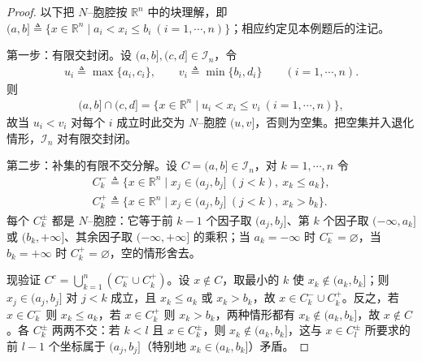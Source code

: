 \documentclass[../../main.tex]{subfiles}%
\begin{document}
\begin{proof}
以下把 $N$--胞腔按 $\mathbb{R}^n$ 中的块理解，即 $(a,b]\triangleq\{x\in\mathbb{R}^n\mid a_i<x_i\leqslant b_i\ (i=1,\cdots,n)\}$；相应约定见本例题后的注记。

第一步：有限交封闭。设 $(a,b],(c,d]\in\mathcal{I}_n$，令
\begin{align*}
u_i\triangleq\max\{a_i,c_i\},\qquad v_i\triangleq\min\{b_i,d_i\}\qquad(i=1,\cdots,n).
\end{align*}
则
\begin{align*}
(a,b]\cap(c,d]=\{x\in\mathbb{R}^n\mid u_i<x_i\leqslant v_i\ (i=1,\cdots,n)\},
\end{align*}
故当 $u_i<v_i$ 对每个 $i$ 成立时此交为 $N$--胞腔 $(u,v]$，否则为空集。把空集并入退化情形，$\mathcal{I}_n$ 对有限交封闭。

第二步：补集的有限不交分解。设 $C=(a,b]\in\mathcal{I}_n$，对 $k=1,\cdots,n$ 令
\begin{align*}
C_k^-\triangleq\{x\in\mathbb{R}^n\mid x_j\in(a_j,b_j]\ (j<k),\ x_k\leqslant a_k\},\\
C_k^+\triangleq\{x\in\mathbb{R}^n\mid x_j\in(a_j,b_j]\ (j<k),\ x_k>b_k\}.
\end{align*}
每个 $C_k^\pm$ 都是 $N$--胞腔：它等于前 $k-1$ 个因子取 $(a_j,b_j]$、第 $k$ 个因子取 $(-\infty,a_k]$ 或 $(b_k,+\infty]$、其余因子取 $(-\infty,+\infty]$ 的乘积；当 $a_k=-\infty$ 时 $C_k^-=\varnothing$，当 $b_k=+\infty$ 时 $C_k^+=\varnothing$，空的情形舍去。

现验证 $C^c=\bigcup_{k=1}^n(C_k^-\cup C_k^+)$。设 $x\notin C$，取最小的 $k$ 使 $x_k\notin(a_k,b_k]$；则 $x_j\in(a_j,b_j]$ 对 $j<k$ 成立，且 $x_k\leqslant a_k$ 或 $x_k>b_k$，故 $x\in C_k^-\cup C_k^+$。反之，若 $x\in C_k^-$ 则 $x_k\leqslant a_k$，若 $x\in C_k^+$ 则 $x_k>b_k$，两种情形都有 $x_k\notin(a_k,b_k]$，故 $x\notin C$。各 $C_k^\pm$ 两两不交：若 $k<l$ 且 $x\in C_k^\pm$，则 $x_k\notin(a_k,b_k]$，这与 $x\in C_l^\pm$ 所要求的前 $l-1$ 个坐标属于 $(a_j,b_j]$（特别地 $x_k\in(a_k,b_k]$）矛盾。


\end{proof}
\end{document}
